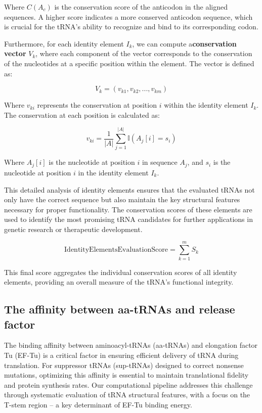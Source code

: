 Where \( C(A_c) \) is the conservation score of the anticodon in the aligned sequences. A higher score indicates a more conserved anticodon sequence, which is crucial for the tRNA’s ability to recognize and bind to its corresponding codon.

Furthermore, for each identity element \( I_k \), we can compute a\textbf{conservation vector} \( V_k \), where each component of the vector corresponds to the conservation of the nucleotides at a specific position within the element. The vector is defined as:

\[
V_k = \left( v_{k1}, v_{k2}, ..., v_{km} \right)
\]

Where \( v_{ki} \) represents the conservation at position \( i \) within the identity element \( I_k \). The conservation at each position is calculated as:

\[
v_{ki} = \frac{1}{|A|} \sum_{j=1}^{|A|} \mathbb{I}(A_j[i] = s_i)
\]

Where \( A_j[i] \) is the nucleotide at position \( i \) in sequence \( A_j \), and \( s_i \) is the nucleotide at position \( i \) in the identity element \( I_k \).

This detailed analysis of identity elements ensures that the evaluated tRNAs not only have the correct sequence but also maintain the key structural features necessary for proper functionality. The conservation scores of these elements are used to identify the most promising tRNA candidates for further applications in genetic research or therapeutic development.

\[
\mathrm{Identity Elements Evaluation Score} = \sum_{k=1}^{m} S_k
\]

This final score aggregates the individual conservation scores of all identity elements, providing an overall measure of the tRNA's functional integrity.

\subsection{The affinity between aa-tRNAs and release factor}
The binding affinity between aminoacyl-tRNAs (aa-tRNAs) and elongation factor Tu (EF-Tu) is a critical factor in ensuring efficient delivery of tRNA during translation. For suppressor tRNAs (sup-tRNAs) designed to correct nonsense mutations, optimizing this affinity is essential to maintain translational fidelity and protein synthesis rates. Our computational pipeline addresses this challenge through systematic evaluation of tRNA structural features, with a focus on the T-stem region – a key determinant of EF-Tu binding energy.

